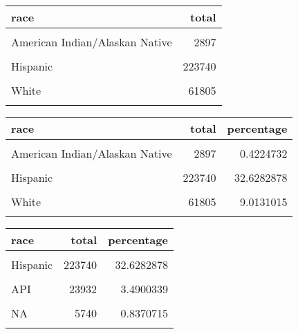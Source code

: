 \documentclass[
  letterpaper,
  DIV=11,
  numbers=noendperiod]{scrartcl}
\begin{document}
\newpage

\begin{table}
\centering
\begin{tabular}{lr}
\toprule
race & total\\
\midrule
\cellcolor{gray!6}{API} & \cellcolor{gray!6}{23932}\\
American Indian/Alaskan Native & 2897\\
\cellcolor{gray!6}{Black} & \cellcolor{gray!6}{350743}\\
Hispanic & 223740\\
\cellcolor{gray!6}{Other} & \cellcolor{gray!6}{16867}\\
\addlinespace
White & 61805\\
\cellcolor{gray!6}{NA} & \cellcolor{gray!6}{5740}\\
\bottomrule
\end{tabular}
\end{table}

\newpage

\begin{table}
\centering
\begin{tabular}{lrr}
\toprule
race & total & percentage\\
\midrule
\cellcolor{gray!6}{API} & \cellcolor{gray!6}{23932} & \cellcolor{gray!6}{3.4900339}\\
American Indian/Alaskan Native & 2897 & 0.4224732\\
\cellcolor{gray!6}{Black} & \cellcolor{gray!6}{350743} & \cellcolor{gray!6}{51.1492962}\\
Hispanic & 223740 & 32.6282878\\
\cellcolor{gray!6}{Other} & \cellcolor{gray!6}{16867} & \cellcolor{gray!6}{2.4597360}\\
\addlinespace
White & 61805 & 9.0131015\\
\cellcolor{gray!6}{NA} & \cellcolor{gray!6}{5740} & \cellcolor{gray!6}{0.8370715}\\
\bottomrule
\end{tabular}
\end{table}

\newpage

\begin{table}
\centering
\begin{tabular}{lrr}
\toprule
race & total & percentage\\
\midrule
\cellcolor{gray!6}{Black} & \cellcolor{gray!6}{350743} & \cellcolor{gray!6}{51.1492962}\\
Hispanic & 223740 & 32.6282878\\
\cellcolor{gray!6}{White} & \cellcolor{gray!6}{61805} & \cellcolor{gray!6}{9.0131015}\\
API & 23932 & 3.4900339\\
\cellcolor{gray!6}{Other} & \cellcolor{gray!6}{16867} & \cellcolor{gray!6}{2.4597360}\\
\addlinespace
NA & 5740 & 0.8370715\\
\cellcolor{gray!6}{American Indian/Alaskan Native} & \cellcolor{gray!6}{2897} & \cellcolor{gray!6}{0.4224732}\\
\bottomrule
\end{tabular}
\end{table}
\end{document}
